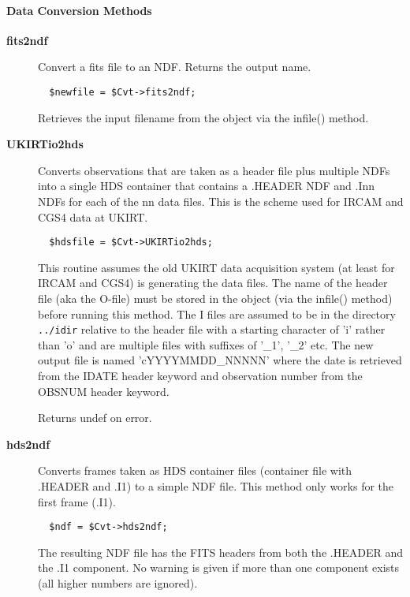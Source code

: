 \paragraph*{Data Conversion Methods\label{ORAC::Convert_Data_Conversion_Methods}}\begin{description}
\item[\textbf{fits2ndf}] \mbox{}

Convert a fits file to an NDF.
Returns the output name.

\begin{verbatim}
  $newfile = $Cvt->fits2ndf;
\end{verbatim}


Retrieves the input filename from the object via the infile()
method.

\item[\textbf{UKIRTio2hds}] \mbox{}

Converts observations that are taken as a header file plus multiple
NDFs into a single HDS container that contains a .HEADER NDF and
.Inn NDFs for each of the nn data files. This is the scheme used for
IRCAM and CGS4 data at UKIRT.

\begin{verbatim}
  $hdsfile = $Cvt->UKIRTio2hds;
\end{verbatim}


This routine assumes the old UKIRT data acquisition system (at least for
IRCAM and CGS4) is generating the data files. The name of the header
file (aka the O-file) must be stored in the object (via the infile()
method) before running this method. The I files are assumed to be in
the directory \texttt{../idir} relative to the header file with a starting
character of 'i' rather than 'o' and are multiple files with
suffixes of '\_1', '\_2' etc. The new output file
is named 'cYYYYMMDD\_NNNNN' where the date is retrieved from the IDATE header
keyword and observation number from the OBSNUM header keyword.



Returns undef on error.

\item[\textbf{hds2ndf}] \mbox{}

Converts frames taken as HDS container files (container file with
.HEADER and .I1) to a simple NDF file. This method only works
for the first frame (.I1).

\begin{verbatim}
  $ndf = $Cvt->hds2ndf;
\end{verbatim}


The resulting NDF file has the FITS headers from both the .HEADER
and the .I1 component. No warning is given if more than one component
exists (all higher numbers are ignored).

\end{description}
